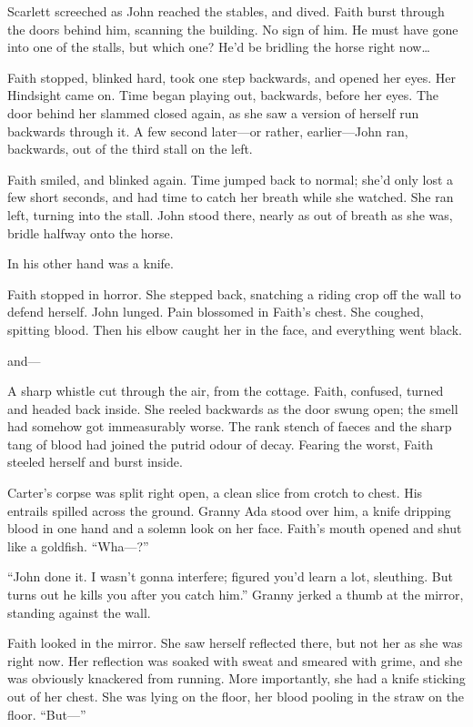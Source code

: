 Scarlett screeched as John reached the stables, and dived.
Faith burst through the doors behind him, scanning the building.
No sign of him.
He must have gone into one of the stalls, but which one?
He'd be bridling the horse right now{\dots}

Faith stopped, blinked hard, took one step backwards, and opened her eyes.
Her Hindsight came on.
Time began playing out, backwards, before her eyes.
The door behind her slammed closed again, as she saw a version of herself run backwards through it.
A few second later---or rather, earlier---John ran, backwards, out of the third stall on the left.

Faith smiled, and blinked again.
Time jumped back to normal; she'd only lost a few short seconds, and had time to catch her breath while she watched.
She ran left, turning into the stall.
John stood there, nearly as out of breath as she was, bridle halfway onto the horse.

In his other hand was a knife.

Faith stopped in horror.
She stepped back, snatching a riding crop off the wall to defend herself.
John lunged.
Pain blossomed in Faith's chest.
She coughed, spitting blood.
Then his elbow caught her in the face, and everything went black.

\storybreak

{\foretellingstoryrepeat}
and---

A sharp whistle cut through the air, from the cottage.
Faith, confused, turned and headed back inside.
She reeled backwards as the door swung open; the smell had somehow got immeasurably worse.
The rank stench of faeces and the sharp tang of blood had joined the putrid odour of decay.
Fearing the worst, Faith steeled herself and burst inside.

Carter's corpse was split right open, a clean slice from crotch to chest.
His entrails spilled across the ground.
Granny Ada stood over him, a knife dripping blood in one hand and a solemn look on her face.
Faith's mouth opened and shut like a goldfish.
``Wha---?''

``John done it.
I wasn't gonna interfere; figured you'd learn a lot, sleuthing.
But turns out he kills you after you catch him.''
Granny jerked a thumb at the mirror, standing against the wall.

Faith looked in the mirror.
She saw herself reflected there, but not her as she was right now.
Her reflection was soaked with sweat and smeared with grime, and she was obviously knackered from running.
More importantly, she had a knife sticking out of her chest.
She was lying on the floor, her blood pooling in the straw on the floor.
``But---''

